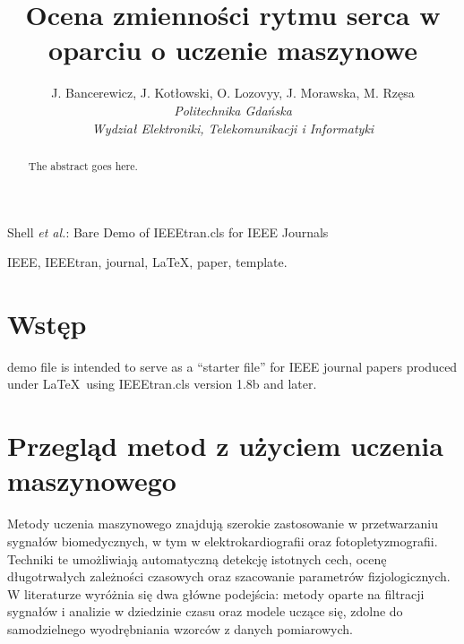 \documentclass[journal]{IEEEtran}
\begin{document}
\title{Ocena zmienności rytmu serca w oparciu o uczenie maszynowe}
\author{
    J. Bancerewicz, J. Kotłowski, O. Lozovyy, J. Morawska, M. Rzęsa\\
    \textit{Politechnika Gdańska}\\
    \textit{Wydział Elektroniki, Telekomunikacji i Informatyki}
}


\markboth{}%
{Shell \MakeLowercase{\textit{et al.}}: Bare Demo of IEEEtran.cls for IEEE Journals}
\maketitle

\begin{abstract}
The abstract goes here.
\end{abstract}

\begin{IEEEkeywords}
IEEE, IEEEtran, journal, \LaTeX, paper, template.
\end{IEEEkeywords}

\IEEEpeerreviewmaketitle



\section{Wstęp}

 demo file is intended to serve as a ``starter file''
for IEEE journal papers produced under \LaTeX\ using
IEEEtran.cls version 1.8b and later.

\newpage
\section{Przegląd metod z użyciem uczenia maszynowego}

Metody uczenia maszynowego znajdują szerokie zastosowanie w przetwarzaniu sygnałów biomedycznych, w tym w elektrokardiografii oraz fotopletyzmografii. Techniki te umożliwiają automatyczną detekcję istotnych cech, ocenę długotrwałych zależności czasowych oraz szacowanie parametrów fizjologicznych. W literaturze wyróżnia się dwa główne podejścia: metody oparte na filtracji sygnałów i analizie w dziedzinie czasu oraz modele uczące się, zdolne do samodzielnego wyodrębniania wzorców z danych pomiarowych.
\end{document}

